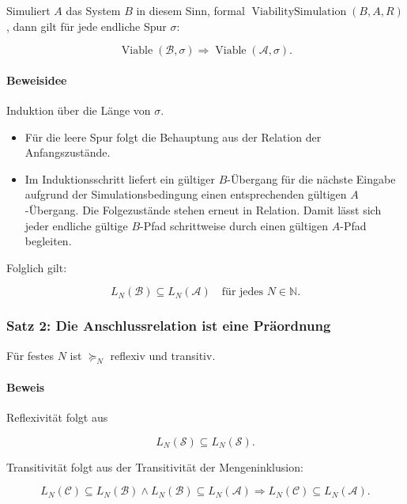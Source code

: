 \documentclass[
  10pt,
  a4paper,
]{article}
\providecommand{\tightlist}{%
  \setlength{\itemsep}{0pt}\setlength{\parskip}{0pt}}
\begin{document}
Simuliert \(A\) das System \(B\) in diesem Sinn, formal
\(\operatorname{ViabilitySimulation}(B,A,R)\), dann gilt für jede
endliche Spur \(\sigma\):

\[
\operatorname{Viable}(\mathcal B,\sigma)
\Longrightarrow
\operatorname{Viable}(\mathcal A,\sigma).
\]

\hypertarget{beweisidee}{%
\paragraph{Beweisidee}\label{beweisidee}}

Induktion über die Länge von \(\sigma\).

\begin{itemize}
\tightlist
\item
  Für die leere Spur folgt die Behauptung aus der Relation der
  Anfangszustände.
\item
  Im Induktionsschritt liefert ein gültiger \(B\)-Übergang für die
  nächste Eingabe aufgrund der Simulationsbedingung einen entsprechenden
  gültigen \(A\)-Übergang. Die Folgezustände stehen erneut in Relation.
  Damit lässt sich jeder endliche gültige \(B\)-Pfad schrittweise durch
  einen gültigen \(A\)-Pfad begleiten.
\end{itemize}

Folglich gilt:

\[
L_N(\mathcal B)\subseteq L_N(\mathcal A)
\quad\text{für jedes }N\in\mathbb N.
\]

\hypertarget{satz-2-die-anschlussrelation-ist-eine-pruxe4ordnung}{%
\subsubsection{Satz 2: Die Anschlussrelation ist eine
Präordnung}\label{satz-2-die-anschlussrelation-ist-eine-pruxe4ordnung}}

Für festes \(N\) ist \(\succeq_N\) reflexiv und transitiv.

\hypertarget{beweis}{%
\paragraph{Beweis}\label{beweis}}

Reflexivität folgt aus

\[
L_N(\mathcal S)\subseteq L_N(\mathcal S).
\]

Transitivität folgt aus der Transitivität der Mengeninklusion:

\[
L_N(\mathcal C)\subseteq L_N(\mathcal B)
\land
L_N(\mathcal B)\subseteq L_N(\mathcal A)
\Longrightarrow
L_N(\mathcal C)\subseteq L_N(\mathcal A).
\]
\end{document}

